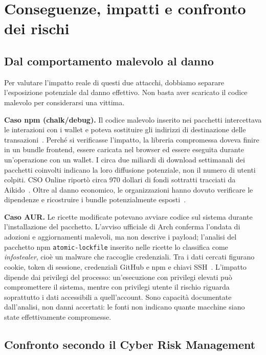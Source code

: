 \section{Conseguenze, impatti e confronto dei rischi}
\label{sec:conseguenze}

\subsection{Dal comportamento malevolo al danno}

Per valutare l'impatto reale di questi due attacchi, dobbiamo separare l'esposizione potenziale dal danno effettivo. Non basta aver scaricato il codice malevolo per considerarsi una vittima.

\textbf{Caso npm (chalk/debug).} Il codice malevolo inserito nei pacchetti intercettava le interazioni con i wallet e poteva sostituire gli indirizzi di destinazione delle transazioni~\cite{debug2025}. Perché si verificasse l'impatto, la libreria compromessa doveva finire in un bundle frontend, essere caricata nel browser ed essere eseguita durante un'operazione con un wallet. I circa due miliardi di download settimanali dei pacchetti coinvolti indicano la loro diffusione potenziale, non il numero di utenti colpiti. CSO Online riportò circa 970 dollari di fondi sottratti tracciati da Aikido~\cite{cso2025}. Oltre al danno economico, le organizzazioni hanno dovuto verificare le dipendenze e ricostruire i bundle potenzialmente esposti~\cite{wiz2025}.

\textbf{Caso AUR.} Le ricette modificate potevano avviare codice sul sistema durante l'installazione del pacchetto. L'avviso ufficiale di Arch conferma l'ondata di adozioni e aggiornamenti malevoli, ma non descrive i payload; l'analisi del pacchetto npm \texttt{atomic-lockfile} inserito nelle ricette lo classifica come \emph{infostealer}, cioè un malware che raccoglie credenziali. Tra i dati cercati figurano cookie, token di sessione, credenziali GitHub e npm e chiavi SSH~\cite{arch-aur-incident-2026,ioctl2026}. L'impatto dipende dai privilegi del processo: un'esecuzione con privilegi elevati può compromettere il sistema, mentre con privilegi utente il rischio riguarda soprattutto i dati accessibili a quell'account. Sono capacità documentate dall'analisi, non danni accertati: le fonti non indicano quante macchine siano state effettivamente compromesse.
\subsection{Confronto secondo il Cyber Risk Management}

